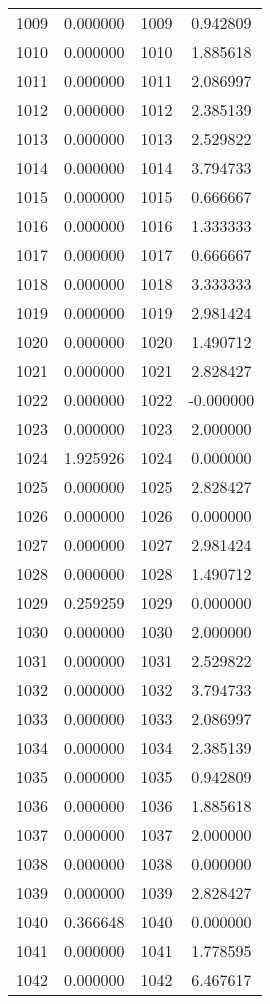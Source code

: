 \documentclass[12pt]{article}
\begin{document}
\begin{longtable}{@{}cccc@{}}
1009 & 0.000000 & 1009 & 0.942809 \\
1010 & 0.000000 & 1010 & 1.885618 \\
1011 & 0.000000 & 1011 & 2.086997 \\
1012 & 0.000000 & 1012 & 2.385139 \\
1013 & 0.000000 & 1013 & 2.529822 \\
1014 & 0.000000 & 1014 & 3.794733 \\
1015 & 0.000000 & 1015 & 0.666667 \\
1016 & 0.000000 & 1016 & 1.333333 \\
1017 & 0.000000 & 1017 & 0.666667 \\
1018 & 0.000000 & 1018 & 3.333333 \\
1019 & 0.000000 & 1019 & 2.981424 \\
1020 & 0.000000 & 1020 & 1.490712 \\
1021 & 0.000000 & 1021 & 2.828427 \\
1022 & 0.000000 & 1022 & -0.000000 \\
1023 & 0.000000 & 1023 & 2.000000 \\
1024 & 1.925926 & 1024 & 0.000000 \\
1025 & 0.000000 & 1025 & 2.828427 \\
1026 & 0.000000 & 1026 & 0.000000 \\
1027 & 0.000000 & 1027 & 2.981424 \\
1028 & 0.000000 & 1028 & 1.490712 \\
1029 & 0.259259 & 1029 & 0.000000 \\
1030 & 0.000000 & 1030 & 2.000000 \\
1031 & 0.000000 & 1031 & 2.529822 \\
1032 & 0.000000 & 1032 & 3.794733 \\
1033 & 0.000000 & 1033 & 2.086997 \\
1034 & 0.000000 & 1034 & 2.385139 \\
1035 & 0.000000 & 1035 & 0.942809 \\
1036 & 0.000000 & 1036 & 1.885618 \\
1037 & 0.000000 & 1037 & 2.000000 \\
1038 & 0.000000 & 1038 & 0.000000 \\
1039 & 0.000000 & 1039 & 2.828427 \\
1040 & 0.366648 & 1040 & 0.000000 \\
1041 & 0.000000 & 1041 & 1.778595 \\
1042 & 0.000000 & 1042 & 6.467617 \\

\end{longtable}
\end{document}
